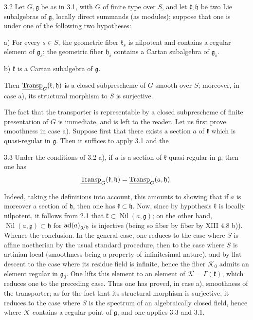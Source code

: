 \begin{corollary}{3.2}\label{XIV.3.2}
Let $G,\mathfrak g$ be as in
3.1, with $G$ of finite type
over $S$, and let
$\mathfrak k,\mathfrak h$ be
two Lie subalgebras of
$\mathfrak g$, locally direct
summands (as modules); suppose
that one is under one of
the following two hypotheses:

\noindent a) For every $s\in S$,
the geometric fiber
$\mathfrak k_{\bar s}$ is
nilpotent and contains a
regular element of
$\mathfrak g_{\bar s}$;
the geometric fiber
$\mathfrak h_{\bar s}$
contains a Cartan subalgebra
of $\mathfrak g_{\bar s}$.

\noindent b) $\mathfrak k$
is a Cartan subalgebra of
$\mathfrak g$.

Then $\underline{\operatorname{Transp}}_G(\mathfrak k,\mathfrak h)$
is a closed subprescheme of
$G$ smooth over $S$; moreover,
in case a), its structural
morphism to $S$ is surjective.
\end{corollary}
The fact that the transporter
is representable by a closed
subprescheme of finite
presentation of $G$ is
immediate, and is left to
the reader. Let us first
prove smoothness in case a).
Suppose first that there
exists a section $a$ of
$\mathfrak k$ which is
quasi-regular in
$\mathfrak g$. Then it
suffices to apply 3.1 and the

\begin{lemma}{3.3}\label{XIV.3.3}
Under the conditions of
3.2 a), if $a$ is a section
of $\mathfrak k$ quasi-regular
in $\mathfrak g$, then one has
\[
 \underline{\operatorname{Transp}}_G(\mathfrak k,\mathfrak h)
 =\underline{\operatorname{Transp}}_G(a,\mathfrak h).
\]
\end{lemma}
Indeed, taking the definitions
into account, this amounts
to showing that if $a$ is
moreover a section of
$\mathfrak h$, then one
has $\mathfrak k\subset\mathfrak h$.
Now, since by hypothesis
$\mathfrak k$ is locally
nilpotent, it follows from
2.1 that $\mathfrak k\subset
\operatorname{Nil}(a,\mathfrak g)$;
on the other hand,
$\operatorname{Nil}(a,\mathfrak g)\subset\mathfrak h$
for $\operatorname{ad}(a)_{\mathfrak g/\mathfrak h}$
is injective (being so
fiber by fiber by XIII
4.8 b)). Whence the conclusion.
In the general case,
one reduces to the case
where $S$ is affine
noetherian by the usual
standard procedure, then
to the case where $S$ is
artinian local (smoothness
being a property of
infinitesimal nature),
and by flat descent to
the case where its residue
field is infinite, hence
the fiber $\mathscr K_0$
admits an element regular
in $\mathfrak g_0$.
One lifts this element
to an element of
$\mathscr K=\Gamma(\mathfrak k)$,
which reduces one to
the preceding case.
Thus one has proved,
in case a), smoothness
of the transporter;
as for the fact that
its structural morphism
is surjective, it reduces
to the case where $S$ is
the spectrum of an
algebraically closed
field, hence where
$\mathscr K$ contains
a regular point of
$\mathfrak g$, and
one applies 3.3 and 3.1.

